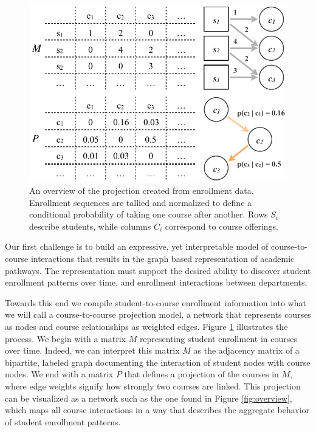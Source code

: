 \documentclass{sigchi}
\begin{document}
\begin{figure}
    \centering
    \includegraphics[width=\columnwidth]{final-simple.pdf}
    \caption{An overview of the projection created from enrollment
      data. Enrollment sequences are tallied and normalized to define
      a conditional probability of taking one course after
      another. Rows $S_i$ describe students, while columns $C_i$
      correspond to course offerings.}
    \label{fig:simple}
\end{figure}

Our first challenge is to build an expressive, yet interpretable model
of course-to-course interactions that results in the graph based
representation of academic pathways. The representation must support
the desired ability to discover student enrollment patterns over time,
and enrollment interactions between departments. 

Towards this end we compile student-to-course enrollment information
into what we will call a course-to-course projection model, a network
that represents courses as nodes and course relationships as weighted
edges. Figure \ref{fig:simple} illustrates the process. We begin with
a matrix $M$ representing student enrollment in courses over
time. Indeed, we can interpret this matrix $M$ as the adjacency matrix
of a bipartite, labeled graph documenting the interaction of student
nodes with course nodes.  We end with a matrix $P$ that defines a
projection of the courses in $M$, where edge weights signify how
strongly two courses are linked. This projection can be visualized as a network such as the one found in Figure \ref{fig:overview}, which maps all course interactions in a way that describes the aggregate behavior of student enrollment patterns.
\end{document}
